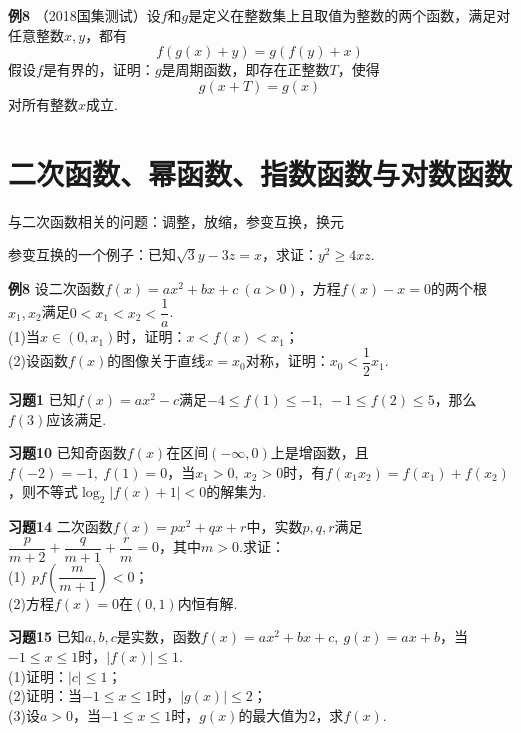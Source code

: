 \documentclass[lang=cn, zihao=4.5]{elegantbook}
\newcommand{\tk}{\uline{\hspace{4em}}}
\newcommand{\ssb}[1]{\left( #1 \right)}
\begin{document}
\newpage
\noindent %
	\textbf{例8} \quad （2018国集测试）设$f$和$g$是定义在整数集上且取值为整数的两个函数，满足对任意整数$x,y$，都有$$f(g(x)+y)=g(f(y)+x)$$
	假设$f$是有界的，证明：$g$是周期函数，即存在正整数$T$，使得$$g(x+T)=g(x)$$
	对所有整数$x$成立.
	
\newpage
\section{二次函数、幂函数、指数函数与对数函数}

与二次函数相关的问题：调整，放缩，参变互换，换元

参变互换的一个例子：已知$\sqrt{3}y - 3z = x$，求证：$y^2 \geq 4xz$.

\vspace{24em}
\noindent %
	\textbf{例8} \quad 设二次函数$f(x)=ax^2+bx+c~(a>0)$，方程$f(x)-x=0$的两个根$x_1,x_2$满足$0<x_1<x_2< \dfrac{1}{a}$. \\
	(1)当$x \in (0,x_1)$时，证明：$x<f(x)<x_1$； \\
	(2)设函数$f(x)$的图像关于直线$x=x_0$对称，证明：$x_0 < \dfrac{1}{2}x_1$.

\newpage
\noindent %
	\textbf{习题1} \quad 已知$f(x)=ax^2-c$满足$-4 \leq f(1) \leq -1,~ -1 \leq f(2) \leq 5$，那么$f(3)$应该满足\tk .

\vspace{30em}
\noindent %
	\textbf{习题10} \quad 已知奇函数$f(x)$在区间$(-\infty ,0)$上是增函数，且$f(-2)=-1,~f(1)=0$，当$x_1>0,~ x_2>0$时，有$f(x_1x_2)=f(x_1)+f(x_2)$，则不等式$\log_{2}{|f(x)+1|}<0$的解集为\tk .
	
\newpage
\noindent %
	\textbf{习题14} \quad 二次函数$f(x)=px^2+qx+r$中，实数$p,q,r$满足$\dfrac{p}{m+2}+\dfrac{q}{m+1}+\dfrac{r}{m}=0$，其中$m>0$.求证： \\
	(1)$~~pf \ssb{\dfrac{m}{m+1}} < 0$； \\
	(2)方程$f(x)=0$在$(0,1)$内恒有解.
	
\vspace{30em}
\noindent %
	\textbf{习题15} \quad 已知$a,b,c$是实数，函数$f(x)=ax^2+bx+c,~g(x)=ax+b$，当$-1 \leq x \leq 1$时，$|f(x)| \leq 1$. \\
	(1)证明：$|c| \leq 1$； \\
	(2)证明：当$-1 \leq x \leq 1$时，$|g(x)| \leq 2$； \\
	(3)设$a>0$，当$-1 \leq x \leq 1$时，$g(x)$的最大值为$2$，求$f(x)$.
\end{document}
